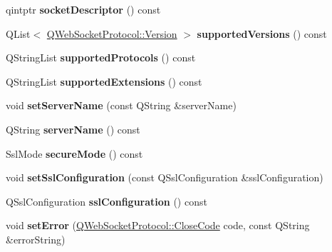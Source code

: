 \begin{DoxyCompactItemize}
\item 
\mbox{\label{class_q_web_socket_server_private_af1ea1254b657d84a7a6883e5b4e06885}} 
qintptr {\bfseries socket\+Descriptor} () const
\item 
\mbox{\label{class_q_web_socket_server_private_ad5bcfe8e232c32d6370f7d3e6d5261dc}} 
Q\+List$<$ \mbox{\hyperlink{namespace_q_web_socket_protocol_ad53f2684577effe0a517eadb48714df3}{Q\+Web\+Socket\+Protocol\+::\+Version}} $>$ {\bfseries supported\+Versions} () const
\item 
\mbox{\label{class_q_web_socket_server_private_a235592581d13182765cdae30a8e61c40}} 
Q\+String\+List {\bfseries supported\+Protocols} () const
\item 
\mbox{\label{class_q_web_socket_server_private_ab55c124888d55fc3d6c05d383a8df583}} 
Q\+String\+List {\bfseries supported\+Extensions} () const
\item 
\mbox{\label{class_q_web_socket_server_private_a206f1b68ef8fd5bcdb41f12a565ac2a3}} 
void {\bfseries set\+Server\+Name} (const Q\+String \&server\+Name)
\item 
\mbox{\label{class_q_web_socket_server_private_a9c34458739408af9e6ac260073801b57}} 
Q\+String {\bfseries server\+Name} () const
\item 
\mbox{\label{class_q_web_socket_server_private_a3d4e0d63b9d2589af6372af3ecc24755}} 
Ssl\+Mode {\bfseries secure\+Mode} () const
\item 
\mbox{\label{class_q_web_socket_server_private_a7f1edb6344bb702cf3c72756fc8053be}} 
void {\bfseries set\+Ssl\+Configuration} (const Q\+Ssl\+Configuration \&ssl\+Configuration)
\item 
\mbox{\label{class_q_web_socket_server_private_a5a847aa695876dc290660d09931250fe}} 
Q\+Ssl\+Configuration {\bfseries ssl\+Configuration} () const
\item 
\mbox{\label{class_q_web_socket_server_private_ad9984bf563e6917ec97a7ed7758f556c}} 
void {\bfseries set\+Error} (\mbox{\hyperlink{namespace_q_web_socket_protocol_a9f236676f594451d8d723f260b71028c}{Q\+Web\+Socket\+Protocol\+::\+Close\+Code}} code, const Q\+String \&error\+String)
\end{DoxyCompactItemize}
